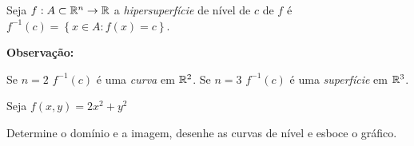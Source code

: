 \documentclass{book}
\begin{document}
\begin{defn}
    Seja $f:A \subset \mathbb{R}^n  \to \mathbb{R}$ a \textit{hipersuperf\'icie} de n\'ivel de $c$ de $f$ \'e $f^{ - 1} \left( c \right) = \left\{ {x \in A:f\left( x \right) = c} \right\}$.
\end{defn}

\textbf{Observa\c c\~ao:}

Se $n=2$ $f^{ - 1} \left( c \right)$ \'e uma \textit{curva} em $\mathbb{R}^2$.
Se $n=3$ $f^{ - 1} \left( c \right)$ \'e uma \textit{superf\'icie} em $\mathbb{R}^3$.

\begin{ex}
Seja $f\left( {x,y} \right) = 2x^2  + y^2$

Determine o dom\'inio e a imagem, desenhe as curvas de n\'ivel e esboce o gr\'afico.
\end{ex}
\end{document}
